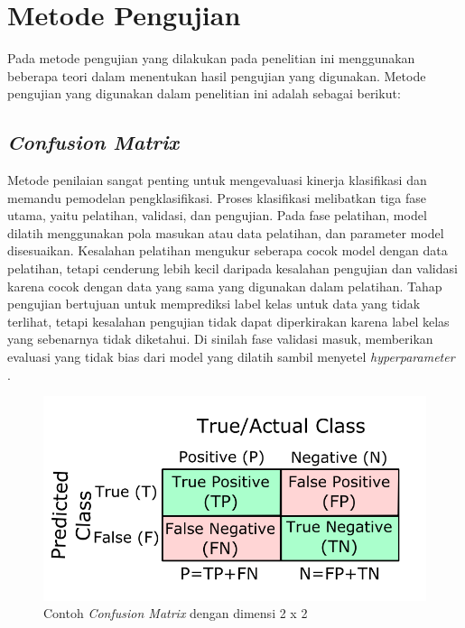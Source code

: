\section{Metode Pengujian}
\label{sec:deteksigesturtubuh}

Pada metode pengujian yang dilakukan pada penelitian ini menggunakan beberapa teori dalam menentukan hasil pengujian yang digunakan. Metode pengujian yang digunakan dalam penelitian ini adalah sebagai berikut:

\subsection{\emph{Confusion Matrix}}
\label{subsec:cnn}

Metode penilaian sangat penting untuk mengevaluasi kinerja klasifikasi dan memandu pemodelan pengklasifikasi. Proses klasifikasi melibatkan tiga fase utama, yaitu pelatihan, validasi, dan pengujian. Pada fase pelatihan, model dilatih menggunakan pola masukan atau data pelatihan, dan parameter model disesuaikan. Kesalahan pelatihan mengukur seberapa cocok model dengan data pelatihan, tetapi cenderung lebih kecil daripada kesalahan pengujian dan validasi karena cocok dengan data yang sama yang digunakan dalam pelatihan. Tahap pengujian bertujuan untuk memprediksi label kelas untuk data yang tidak terlihat, tetapi kesalahan pengujian tidak dapat diperkirakan karena label kelas yang sebenarnya tidak diketahui. Di sinilah fase validasi masuk, memberikan evaluasi yang tidak bias dari model yang dilatih sambil menyetel \emph{hyperparameter} \parencite{Tharwat}.

\begin{figure}[H]
  \centering
  \includegraphics[scale=0.6]{gambar/confusionmatrix.png}
  \caption{Contoh \emph{Confusion Matrix} dengan dimensi 2 x 2 \parencite{Tharwat}}
  \label{fig:confusionmatrixex}
\end{figure}

